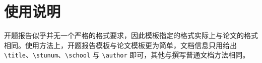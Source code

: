 \documentclass[class = opening]{whuthesis}
\begin{document}
\section{使用说明}
开题报告似乎并无一个严格的格式要求，因此模板指定的格式实际上与论文的格式相同。使用方法上，开题报告模板与论文模板更为简单，文档信息只用给出 \verb|\title|、\verb|\stunum|、\verb|\school| 与 \verb|\author| 即可，其他与撰写普通文档方法相同。

\nocite{*}
\end{document}
